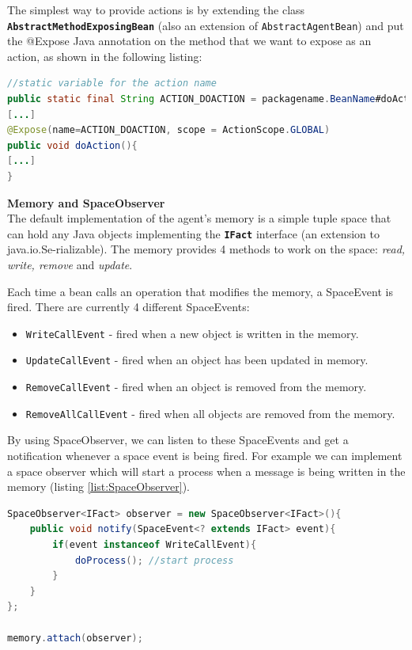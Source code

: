 The simplest way to provide actions is by extending the class \textbf{\texttt{AbstractMethodExposingBean}} (also an extension of \texttt{AbstractAgentBean}) and put the @Expose Java annotation on the method that we want to expose as an action, as shown in the following listing:
\begin{lstlisting}[language = Java, caption = Providing an Action]
//static variable for the action name
public static final String ACTION_DOACTION = packagename.BeanName#doAction;
[...]
@Expose(name=ACTION_DOACTION, scope = ActionScope.GLOBAL)
public void doAction(){
[...]
}
\end{lstlisting}

\textbf{Memory and SpaceObserver}\\
The default implementation of the agent's memory is a simple tuple space that can hold any Java objects implementing the \textbf{\texttt{IFact}} interface (an extension to java.io.Se-rializable). The memory provides 4 methods to work on the space:\textit{ read, write, remove} and \textit{update}.

Each time a bean calls an operation that modifies the memory, a SpaceEvent is fired. There are currently 4 different SpaceEvents:
\begin{itemize}
	\item \texttt{WriteCallEvent} - fired when a new object is written in the memory.
	\item \texttt{UpdateCallEvent} - fired when an object has been updated in memory.
	\item \texttt{RemoveCallEvent} - fired when an object is removed from the memory.
	\item \texttt{RemoveAllCallEvent} - fired when all objects are removed from the memory.
\end{itemize}

By using SpaceObserver, we can listen to these SpaceEvents and get a notification whenever a space event is being fired.
For example we can implement a space observer which will start a process when a message is being written in the memory (listing \ref{list:SpaceObserver}). 
\begin{lstlisting}[language = Java, caption = A SpaceObserver, label = list:SpaceObserver]
SpaceObserver<IFact> observer = new SpaceObserver<IFact>(){
	public void notify(SpaceEvent<? extends IFact> event){
		if(event instanceof WriteCallEvent){
			doProcess(); //start process
		}
	}
};

memory.attach(observer);
\end{lstlisting}

